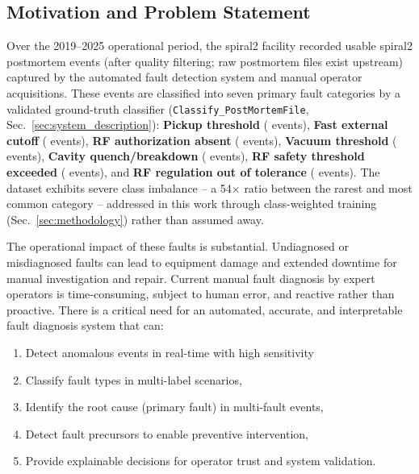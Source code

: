 \subsection{Motivation and Problem Statement}

Over the 2019--2025 %
operational period, the \gls{spiral2} facility recorded \MetricZeroZeroDataAttritionChainVSixTotalEvents{} usable \gls{spiral2} postmortem events (after quality filtering; \MetricZeroZeroDataAttritionChainRawFiles{} raw postmortem files exist upstream) captured by the automated fault detection system and manual operator acquisitions. These events are classified into seven primary fault categories by a validated ground-truth classifier (\texttt{Classify\_PostMortemFile}, Sec.~\ref{sec:system_description}): \textbf{Pickup threshold} (\MetricZeroZeroDataAttritionChainGtPassingSeuilPickUp{} events), \textbf{Fast external cutoff} (\MetricZeroZeroDataAttritionChainGtPassingCoupureExterneRapide{} events), \textbf{RF authorization absent} (\MetricZeroZeroDataAttritionChainGtPassingAbsenceAutorisationRf{} events), \textbf{Vacuum threshold} (\MetricZeroZeroDataAttritionChainGtPassingSeuilDeVide{} events), \textbf{Cavity quench/breakdown} (\MetricZeroZeroDataAttritionChainGtPassingClaquageOuQuenchCavit{} events), \textbf{RF safety threshold exceeded} (\MetricZeroZeroDataAttritionChainGtPassingDPSeuilDeSCuritRf{} events), and \textbf{RF regulation out of tolerance} (\MetricZeroZeroDataAttritionChainGtPassingRGSignalRfHorsTolRance{} events). The dataset exhibits severe class imbalance -- a 54$\times$ ratio between the rarest and most common category %
-- addressed in this work through class-weighted training (Sec.~\ref{sec:methodology}) rather than assumed away.

The operational impact of these faults is substantial. Undiagnosed or misdiagnosed faults can lead to equipment damage and extended downtime for manual investigation and repair. Current manual fault diagnosis by expert operators is time-consuming, subject to human error, and reactive rather than proactive. There is a critical need for an automated, accurate, and interpretable fault diagnosis system that can:

\begin{enumerate}
    \item Detect anomalous events in real-time with high sensitivity
    \item Classify fault types in multi-label scenarios,
    \item Identify the root cause (primary fault) in multi-fault events,
    \item Detect fault precursors to enable preventive intervention,
    \item Provide explainable decisions for operator trust and system validation.
\end{enumerate}

